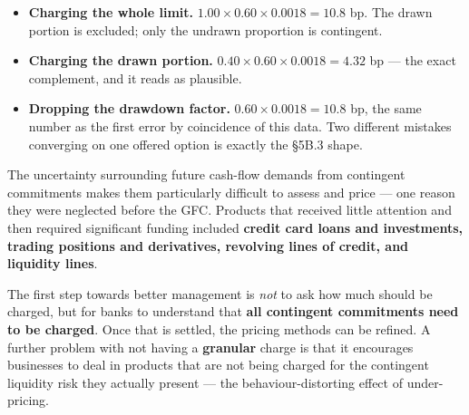 \begin{lrtrapbox}
\begin{itemize}
\item \textbf{Charging the whole limit.} $1.00 \times 0.60 \times 0.0018 = 10.8$ bp. The drawn portion is excluded; only the undrawn proportion is contingent.
\item \textbf{Charging the drawn portion.} $0.40 \times 0.60 \times 0.0018 = 4.32$ bp --- the exact complement, and it reads as plausible.
\item \textbf{Dropping the drawdown factor.} $0.60 \times 0.0018 = 10.8$ bp, the same number as the first error by coincidence of this data. Two different mistakes converging on one offered option is exactly the \S5B.3 shape.
\end{itemize}
\end{lrtrapbox}

\begin{lrkeybox}
The uncertainty surrounding future cash-flow demands from contingent commitments makes them particularly difficult to assess and price --- one reason they were neglected before the GFC. Products that received little attention and then required significant funding included \textbf{credit card loans and investments, trading positions and derivatives, revolving lines of credit, and liquidity lines}.

The first step towards better management is \emph{not} to ask how much should be charged, but for banks to understand that \textbf{all contingent commitments need to be charged}. Once that is settled, the pricing methods can be refined. A further problem with not having a \textbf{granular} charge is that it encourages businesses to deal in products that are not being charged for the contingent liquidity risk they actually present --- the behaviour-distorting effect of under-pricing.
\end{lrkeybox}

